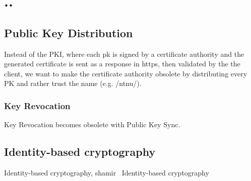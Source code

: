 \chapter{..}

\section{Public Key Distribution}
Instead of the PKI, where each pk is signed by a certificate authority and the generated certificate is sent as a response in https, then validated by the the client, we want to make the certificate authority obsolete by distributing every PK and rather trust the name (e.g. /ntnu/). 

\subsection{Key Revocation}
Key Revocation becomes obsolete with Public Key Sync. 

\section{Identity-based cryptography}
Identity-based cryptography, shamir~\cite{DBLP:conf/crypto/Shamir84}
Identity-based cryptography~\cite{DBLP:conf/icnp/ZhangCXWSW11}
